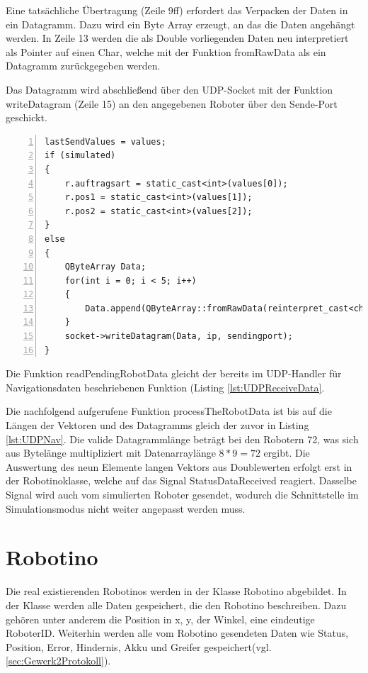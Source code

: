 Eine tatsächliche Übertragung (Zeile 9ff) erfordert das Verpacken der Daten in ein Datagramm. Dazu wird ein Byte Array erzeugt, an das die Daten angehängt werden. In Zeile 13 werden die als Double vorliegenden Daten neu interpretiert als Pointer auf einen Char, welche mit der Funktion fromRawData als ein Datagramm zurückgegeben werden. 

Das Datagramm wird abschließend über den UDP-Socket mit der Funktion writeDatagram (Zeile 15) an den angegebenen Roboter über den Sende-Port geschickt. 

\begin{lstlisting}[frame=single, breaklines=true, numbers=left, stepnumber=2, firstnumber=1, numberstyle = \tiny, caption=Daten über UDP verschicken,label=lst:UDPWriteData]
lastSendValues = values;
if (simulated)
{
    r.auftragsart = static_cast<int>(values[0]);
    r.pos1 = static_cast<int>(values[1]);
    r.pos2 = static_cast<int>(values[2]);
}
else
{
    QByteArray Data;
    for(int i = 0; i < 5; i++)
    {
        Data.append(QByteArray::fromRawData(reinterpret_cast<char*>(&values[i]), sizeof(values[i])));
    }
    socket->writeDatagram(Data, ip, sendingport);
}
\end{lstlisting}

Die Funktion readPendingRobotData gleicht der bereits im UDP-Handler für Navigationsdaten beschriebenen Funktion (Listing \ref{lst:UDPReceiveData}. 

Die nachfolgend aufgerufene Funktion processTheRobotData ist bis auf die Längen der Vektoren und des Datagramms gleich der zuvor in Listing \ref{lst:UDPNav}. Die valide Datagrammlänge beträgt bei den Robotern 72, was sich aus Bytelänge multipliziert mit Datenarraylänge $ 8 * 9 = 72$ ergibt. Die Auswertung des neun Elemente langen Vektors aus Doublewerten erfolgt erst in der Robotinoklasse, welche auf das Signal StatusDataReceived reagiert. Dasselbe Signal wird auch vom simulierten Roboter gesendet, wodurch die Schnittstelle im Simulationsmodus nicht weiter angepasst werden muss. 

\section{Robotino} 

Die real existierenden Robotinos werden in der Klasse Robotino abgebildet. In der Klasse werden alle Daten gespeichert, die den Robotino beschreiben. Dazu gehören unter anderem die Position in x, y, der Winkel, eine eindeutige RoboterID. Weiterhin werden alle vom Robotino gesendeten Daten wie Status, Position, Error, Hindernis, Akku und Greifer gespeichert(vgl. \ref{sec:Gewerk2Protokoll}). 

